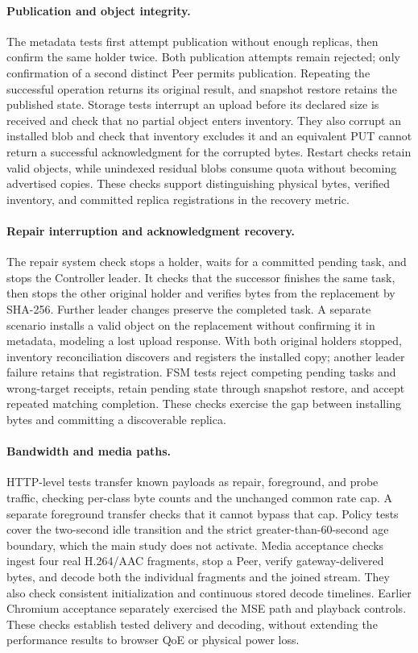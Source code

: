 \paragraph{Publication and object integrity.}
The metadata tests first attempt publication without enough replicas, then
confirm the same holder twice. Both publication attempts remain rejected;
only confirmation of a second distinct Peer permits publication. Repeating
the successful operation returns its original result, and snapshot restore
retains the published state. Storage tests interrupt an upload before its
declared size is received and check that no partial object enters inventory.
They also corrupt an installed blob and check that inventory excludes it
and an equivalent PUT cannot return a successful acknowledgment for the
corrupted bytes. Restart checks retain valid objects, while unindexed
residual blobs consume quota without becoming advertised copies. These
checks support distinguishing physical bytes, verified inventory, and
committed replica registrations in the recovery metric.

\paragraph{Repair interruption and acknowledgment recovery.}
The repair system check stops a holder, waits for a committed pending task,
and stops the Controller leader. It checks that the successor finishes the
same task, then stops the other original holder and verifies bytes from the
replacement by SHA-256. Further leader changes preserve the completed task.
A separate scenario installs a valid object on the replacement without
confirming it in metadata, modeling a lost upload response. With both
original holders stopped, inventory reconciliation discovers and registers
the installed copy; another leader failure retains that registration.
FSM tests reject competing pending tasks and wrong-target receipts, retain
pending state through snapshot restore, and accept repeated matching
completion. These checks exercise the gap between installing bytes and
committing a discoverable replica.

\paragraph{Bandwidth and media paths.}
HTTP-level tests transfer known payloads as repair, foreground, and probe
traffic, checking per-class byte counts and the unchanged common rate cap.
A separate foreground transfer checks that it cannot bypass that cap.
Policy tests cover the two-second idle transition and the strict
greater-than-60-second age boundary, which the main study does not activate.
Media acceptance checks ingest four real
H.264/AAC fragments, stop a Peer, verify gateway-delivered bytes, and decode
both the individual fragments and the joined stream. They also check
consistent initialization and continuous stored decode timelines. Earlier
Chromium acceptance separately exercised the MSE path and playback controls.
These checks establish tested delivery and decoding, without extending the
performance results to browser QoE or physical power loss.
